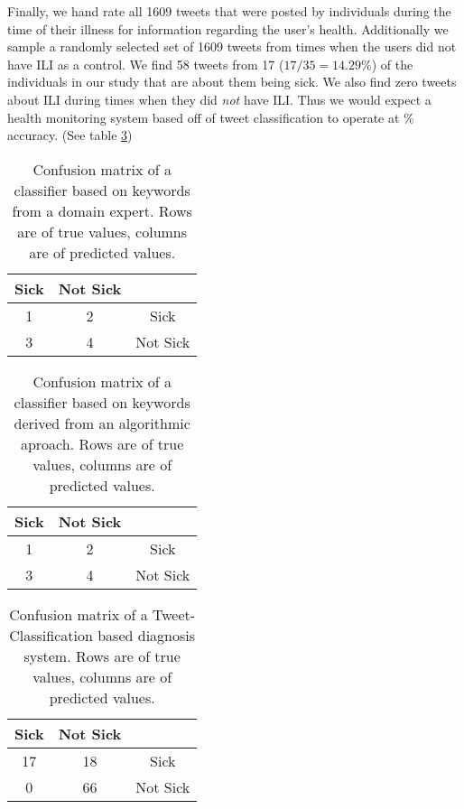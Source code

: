 \documentclass{acm_proc_article-sp}
\begin{document}
Finally, we hand rate all 1609 tweets that were posted by individuals during the time of their illness for information regarding the user's health. Additionally we sample a randomly selected set of 1609 tweets from times when the users did not have ILI as a control. We find 58 tweets from 17 (\(17/35 = 14.29\%\)) of the individuals in our study that are about them being sick. We also find zero tweets about ILI during times when they did \textit{not} have ILI. Thus we would expect a health monitoring system based off of tweet classification to operate at \% accuracy. (See table \ref{tab:tweet_classified_confusion})


\begin{table}
\centering
\begin{tabular}{|c|c|c|} \hline
Sick&Not Sick&\ \\ \hline
1 & 2& Sick\\ \hline
3 & 4  & Not Sick\\
\hline\end{tabular}
\caption{Confusion matrix of a classifier based on keywords from a domain expert. Rows are of true values, columns are of predicted values.}
\label{tab:tweet_keyword_expert_confusion}
\end{table}

\begin{table}
\centering
\begin{tabular}{|c|c|c|} \hline
Sick&Not Sick&\ \\ \hline
1 & 2& Sick\\ \hline
3 & 4  & Not Sick\\
\hline\end{tabular}
\caption{Confusion matrix of a classifier based on keywords derived from an algorithmic aproach. Rows are of true values, columns are of predicted values.}
\label{tab:tweet_keyword_algorithm_classified_confusion}
\end{table}

\begin{table}
\centering
\begin{tabular}{|c|c|c|} \hline
Sick&Not Sick&\ \\ \hline
17 & 18 & Sick\\ \hline
0 & 66  & Not Sick\\
\hline\end{tabular}
\caption{Confusion matrix of a Tweet-Classification based diagnosis system. Rows are of true values, columns are of predicted values.}
\label{tab:tweet_classified_confusion}
\end{table}
\end{document}
